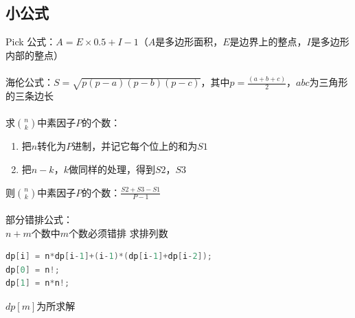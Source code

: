 	\subsection{小公式}
	Pick 公式：$A = E\times 0.5+I-1$（$A$是多边形面积，$E$是边界上的整点，$I$是多边形内部的整点）\\
	\\
	海伦公式：$S = \sqrt{p(p-a)(p-b)(p-c)}$，其中$p = \frac{(a+b+c)}{2}$，$abc$为三角形的三条边长\\
	\\
	求$\binom{n}{k}$中素因子$P$的个数：\\
	\begin {enumerate}
	\item 把$n$转化为$P$进制，并记它每个位上的和为$S1$
	\item 把$n-k$，$k$做同样的处理，得到$S2$，$S3$
	\end{enumerate}
	则$\binom{n}{k}$中素因子$P$的个数：$\frac{S2+S3-S1}{P-1}$\\
	\\
	部分错排公式：\\
	$n+m$个数中$m$个数必须错排 求排列数
	\begin{lstlisting}[language=c++]
dp[i] = n*dp[i-1]+(i-1)*(dp[i-1]+dp[i-2]);
dp[0] = n!;
dp[1] = n*n!;
	\end{lstlisting}
	$dp[m]$为所求解\\
